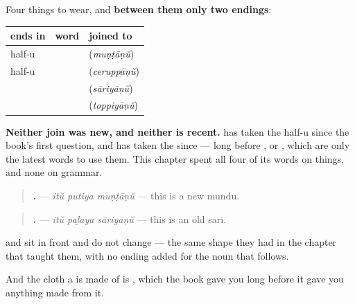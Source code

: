 \begin{grammarlens}[title={Grammar Lens: two endings, and an adjective that never moves}]
Four things to wear, and \textbf{between them only two endings}:

\noindent
\begin{tabularx}{\linewidth}{@{}>{\raggedright\arraybackslash}X>{\raggedright\arraybackslash}X>{\raggedright\arraybackslash}X@{}}
\toprule
\textbf{ends in} & \textbf{word} & \textbf{joined to \textbf{\ml{ആണ്}}} \\
\midrule
half-u & \textbf{\ml{മുണ്ട്}} & \textbf{\ml{മുണ്ടാണ്}} (\emph{muṇṭāṇŭ}) \\
half-u & \textbf{\ml{ചെരുപ്പ്}} & \textbf{\ml{ചെരുപ്പാണ്}} (\emph{ceruppāṇŭ}) \\
\textbf{\ml{ഇ}} & \textbf{\ml{സാരി}} & \textbf{\ml{സാരിയാണ്}} (\emph{sāriyāṇŭ}) \\
\textbf{\ml{ഇ}} & \textbf{\ml{തൊപ്പി}} & \textbf{\ml{തൊപ്പിയാണ്}} (\emph{toppiyāṇŭ}) \\
\bottomrule
\end{tabularx}

\textbf{Neither join was new, and neither is recent.} \textbf{} has taken the half-u since the book's first question, and \textbf{} has taken the \textbf{} since \textbf{  } — long before \textbf{}, \textbf{} or \textbf{}, which are only the latest words to use them. This chapter spent all four of its words on things, and none on grammar.
\end{grammarlens}

\begin{grammarlens}[title={What you've built}]
\begin{quote}
\textbf{  .} — \emph{itŭ putiya muṇṭāṇŭ} — this is a new mundu.
\end{quote}

\begin{quote}
\textbf{  .} — \emph{itŭ paḻaya sāriyāṇŭ} — this is an old sari.
\end{quote}

\textbf{} and \textbf{} sit in front and do not change — the same shape they had in the chapter that taught them, with no ending added for the noun that follows.

And the cloth a \textbf{} is made of is \textbf{}, which the book gave you long before it gave you anything made from it.
\end{grammarlens}


